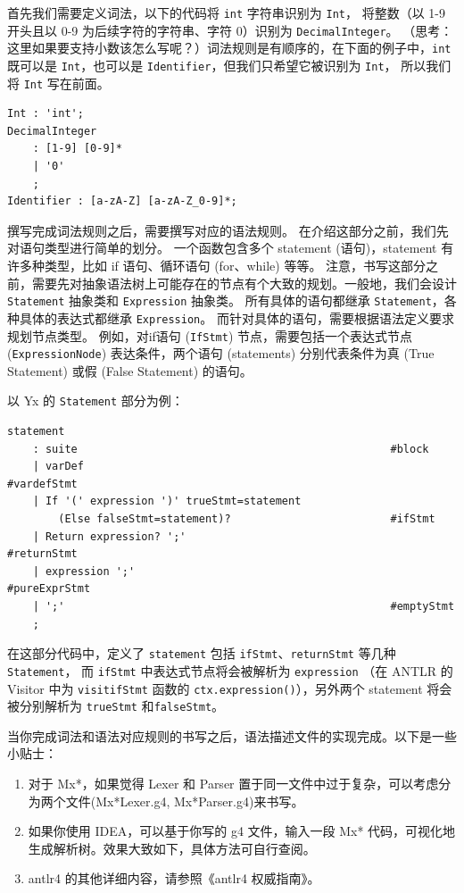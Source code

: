首先我们需要定义词法，以下的代码将 \texttt{int} 字符串识别为 \texttt{Int}，
将整数（以 1-9 开头且以 0-9 为后续字符的字符串、字符 0）识别为 \texttt{DecimalInteger}。
（思考：这里如果要支持小数该怎么写呢？）词法规则是有顺序的，在下面的例子中，\texttt{int}
既可以是 \texttt{Int}，也可以是 \texttt{Identifier}，但我们只希望它被识别为 \texttt{Int}，
所以我们将 \texttt{Int} 写在前面。
\begin{lstlisting}
Int : 'int';
DecimalInteger
    : [1-9] [0-9]*
    | '0'
    ;
Identifier : [a-zA-Z] [a-zA-Z_0-9]*;
\end{lstlisting}



撰写完成词法规则之后，需要撰写对应的语法规则。
在介绍这部分之前，我们先对语句类型进行简单的划分。
一个函数包含多个 statement (语句)，statement 有许多种类型，比如 if 语句、循环语句 (for、while) 等等。
注意，书写这部分之前，需要先对抽象语法树上可能存在的节点有个大致的规划。一般地，我们会设计 \texttt{Statement}
抽象类和 \texttt{Expression} 抽象类。
所有具体的语句都继承 \texttt{Statement}，各种具体的表达式都继承 \texttt{Expression}。
而针对具体的语句，需要根据语法定义要求规划节点类型。
例如，对if语句 (\texttt{IfStmt}) 节点，需要包括一个表达式节点 (\texttt{ExpressionNode})
表达条件，两个语句 (statements) 分别代表条件为真 (True Statement) 或假 (False Statement) 的语句。

以 Yx 的 \texttt{Statement} 部分为例：
\begin{lstlisting}
statement
    : suite                                                 #block
    | varDef                                                #vardefStmt
    | If '(' expression ')' trueStmt=statement 
        (Else falseStmt=statement)?                         #ifStmt
    | Return expression? ';'                                #returnStmt
    | expression ';'                                        #pureExprStmt
    | ';'                                                   #emptyStmt
    ;
\end{lstlisting}
在这部分代码中，定义了 \texttt{statement}
包括 \texttt{ifStmt}、\texttt{returnStmt} 等几种\texttt{Statement}，
而 \texttt{ifStmt} 中表达式节点将会被解析为 \texttt{expression}
（在 ANTLR 的 Visitor 中为 \texttt{visitifStmt} 函数的 \texttt{ctx.expression()}），另外两个
statement 将会被分别解析为 \texttt{trueStmt} 和\texttt{falseStmt}。


当你完成词法和语法对应规则的书写之后，语法描述文件的实现完成。以下是一些小贴士：
\begin{enumerate}
    \item 对于 Mx*，如果觉得 Lexer 和 Parser 置于同一文件中过于复杂，可以考虑分为两个文件(Mx*Lexer.g4, Mx*Parser.g4)来书写。
    \item 如果你使用 IDEA，可以基于你写的 g4 文件，输入一段 Mx* 代码，可视化地生成解析树。效果大致如下，具体方法可自行查阅。
    \item antlr4 的其他详细内容，请参照《antlr4 权威指南》。
\end{enumerate}

